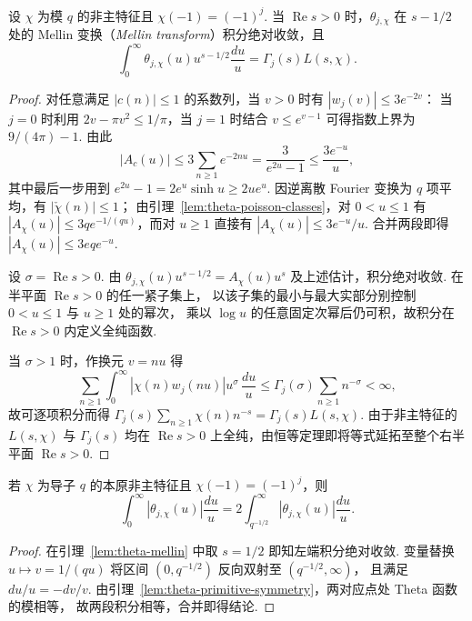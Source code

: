 \begin{lemma}
\label{lem:theta-mellin}
\emitthmsource
设 $\chi$ 为模 $q$ 的非主特征且 $\chi(-1)=(-1)^j$.
当 $\operatorname{Re}s>0$ 时，$\theta_{j,\chi}$ 在 $s-1/2$ 处的 Mellin 变换（\emph{Mellin transform}）积分绝对收敛，且
\[
 \int_0^\infty\theta_{j,\chi}(u)u^{s-1/2}\frac{du}{u}
   =\Gamma_j(s)L(s,\chi).
\]
\end{lemma}
\begin{proof}
对任意满足 $|c(n)|\le1$ 的系数列，当 $v>0$ 时有 $|w_j(v)|\le3e^{-2v}$：
当 $j=0$ 时利用 $2v-\pi v^2\le1/\pi$，当 $j=1$ 时结合 $v\le e^{v-1}$ 可得指数上界为 $9/(4\pi)-1$.
由此
\[
 |A_c(u)|\le 3\sum_{n\ge1}e^{-2nu}
 =\frac{3}{e^{2u}-1}\le\frac{3e^{-u}}{u},
\]
其中最后一步用到 $e^{2u}-1=2e^u\sinh u\ge2ue^u$.
因逆离散 Fourier 变换为 $q$ 项平均，有 $|\check\chi(n)|\le1$；
由引理~\ref{lem:theta-poisson-classes}，对 $0<u\le1$ 有
$|A_\chi(u)|\le 3q e^{-1/(qu)}$，而对 $u\ge1$ 直接有 $|A_\chi(u)|\le 3e^{-u}/u$. 合并两段即得 $|A_\chi(u)|\le 3eq e^{-u}$.

设 $\sigma=\operatorname{Re}s>0$. 由
$\theta_{j,\chi}(u)u^{s-1/2}=A_\chi(u)u^s$ 及上述估计，积分绝对收敛. 在半平面 $\operatorname{Re}s>0$ 的任一紧子集上，
以该子集的最小与最大实部分别控制 $0<u\le1$ 与 $u\ge1$ 处的幂次，
乘以 $\log u$ 的任意固定次幂后仍可积，故积分在 $\operatorname{Re}s>0$ 内定义全纯函数.

当 $\sigma>1$ 时，作换元 $v=nu$ 得
\[
 \sum_{n\ge1}\int_0^\infty |\chi(n)w_j(nu)|u^\sigma\,\frac{du}{u}
 \le \Gamma_j(\sigma)\sum_{n\ge1} n^{-\sigma}<\infty ,
\]
故可逐项积分而得 $\Gamma_j(s)\sum_{n\ge1}\chi(n)n^{-s}=\Gamma_j(s)L(s,\chi)$.
由于非主特征的 $L(s,\chi)$ 与 $\Gamma_j(s)$ 均在 $\operatorname{Re}s>0$ 上全纯，由恒等定理即将等式延拓至整个右半平面 $\operatorname{Re}s>0$.
\end{proof}

\begin{lemma}
\label{lem:theta-integral-fold}
\emitthmsource
若 $\chi$ 为导子 $q$ 的本原非主特征且 $\chi(-1)=(-1)^j$，则
\[
 \int_0^\infty|\theta_{j,\chi}(u)|\frac{du}{u}
 =2\int_{q^{-1/2}}^\infty|\theta_{j,\chi}(u)|\frac{du}{u}.
\]
\end{lemma}
\begin{proof}
在引理~\ref{lem:theta-mellin} 中取 $s=1/2$ 即知左端积分绝对收敛.
变量替换 $u\mapsto v=1/(qu)$ 将区间 $(0,q^{-1/2})$ 反向双射至 $(q^{-1/2},\infty)$，
且满足 $du/u=-dv/v$. 由引理~\ref{lem:theta-primitive-symmetry}，两对应点处 Theta 函数的模相等，
故两段积分相等，合并即得结论.
\end{proof}

